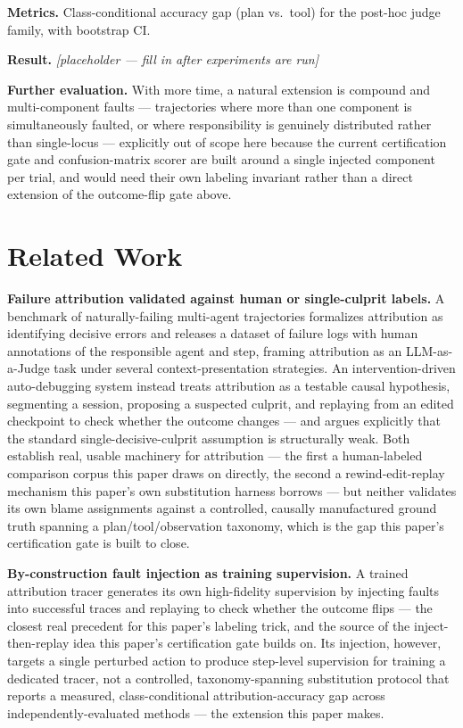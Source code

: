 \documentclass[11pt]{article}
\newcommand{\ph}{\textit{[placeholder --- fill in after experiments are run]}}
\begin{document}
\textbf{Metrics.} Class-conditional accuracy gap (plan vs.\ tool) for the post-hoc judge family, with bootstrap CI.

\textbf{Result.} \ph

\vspace{0.5em}
\noindent\textbf{Further evaluation.} With more time, a natural extension is compound and multi-component faults --- trajectories where more than one component is simultaneously faulted, or where responsibility is genuinely distributed rather than single-locus --- explicitly out of scope here because the current certification gate and confusion-matrix scorer are built around a single injected component per trial, and would need their own labeling invariant rather than a direct extension of the outcome-flip gate above.

\section{Related Work}

\textbf{Failure attribution validated against human or single-culprit labels.} A benchmark of naturally-failing multi-agent trajectories \citep{WhoAndWhen2025} formalizes attribution as identifying decisive errors and releases a dataset of failure logs with human annotations of the responsible agent and step, framing attribution as an LLM-as-a-Judge task under several context-presentation strategies. An intervention-driven auto-debugging system \citep{DoVer2025} instead treats attribution as a testable causal hypothesis, segmenting a session, proposing a suspected culprit, and replaying from an edited checkpoint to check whether the outcome changes --- and argues explicitly that the standard single-decisive-culprit assumption is structurally weak. Both establish real, usable machinery for attribution --- the first a human-labeled comparison corpus this paper draws on directly, the second a rewind-edit-replay mechanism this paper's own substitution harness borrows --- but neither validates its own blame assignments against a controlled, causally manufactured ground truth spanning a plan/tool/observation taxonomy, which is the gap this paper's certification gate is built to close.

\textbf{By-construction fault injection as training supervision.} A trained attribution tracer \citep{AgenTracer2025} generates its own high-fidelity supervision by injecting faults into successful traces and replaying to check whether the outcome flips --- the closest real precedent for this paper's labeling trick, and the source of the inject-then-replay idea this paper's certification gate builds on. Its injection, however, targets a single perturbed action to produce step-level supervision for training a dedicated tracer, not a controlled, taxonomy-spanning substitution protocol that reports a measured, class-conditional attribution-accuracy gap across independently-evaluated methods --- the extension this paper makes.
\end{document}
